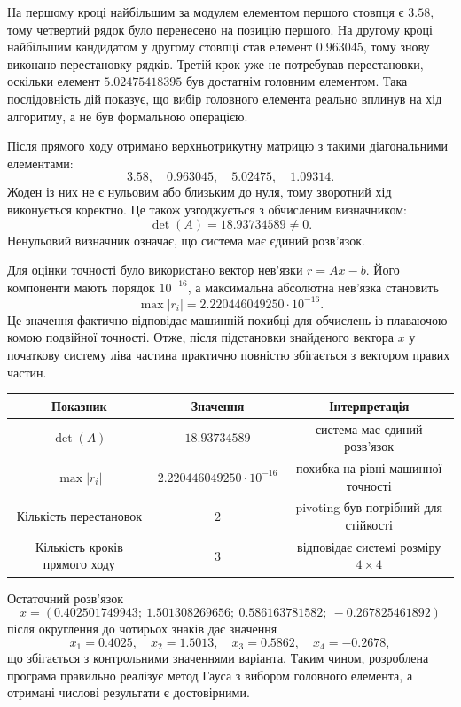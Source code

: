 \documentclass[12pt,a4paper]{article}
\begin{document}
    На першому кроці найбільшим за модулем елементом першого стовпця є $3.58$, тому четвертий
    рядок було перенесено на позицію першого. На другому кроці найбільшим кандидатом у другому
    стовпці став елемент $0.963045$, тому знову виконано перестановку рядків. Третій крок уже
    не потребував перестановки, оскільки елемент $5.02475418395$ був достатнім головним
    елементом. Така послідовність дій показує, що вибір головного елемента реально вплинув на
    хід алгоритму, а не був формальною операцією.

    Після прямого ходу отримано верхньотрикутну матрицю з такими діагональними елементами:
    \[
        3.58,\quad 0.963045,\quad 5.02475,\quad 1.09314.
    \]
    Жоден із них не є нульовим або близьким до нуля, тому зворотний хід виконується коректно.
    Це також узгоджується з обчисленим визначником:
    \[
        \det(A)=18.93734589 \neq 0.
    \]
    Ненульовий визначник означає, що система має єдиний розв'язок.

    Для оцінки точності було використано вектор нев'язки $r=Ax-b$. Його компоненти мають порядок
    $10^{-16}$, а максимальна абсолютна нев'язка становить
    \[
        \max |r_i|=2.220446049250\cdot10^{-16}.
    \]
    Це значення фактично відповідає машинній похибці для обчислень із плаваючою комою подвійної
    точності. Отже, після підстановки знайденого вектора $x$ у початкову систему ліва частина
    практично повністю збігається з вектором правих частин.

    \begin{center}
        \begin{tabular}{|c|c|c|}
            \hline
            Показник & Значення & Інтерпретація \\
            \hline
            $\det(A)$ & $18.93734589$ & система має єдиний розв'язок \\
            \hline
            $\max |r_i|$ & $2.220446049250\cdot10^{-16}$ & похибка на рівні машинної точності \\
            \hline
            Кількість перестановок & $2$ & pivoting був потрібний для стійкості \\
            \hline
            Кількість кроків прямого ходу & $3$ & відповідає системі розміру $4\times4$ \\
            \hline
        \end{tabular}
    \end{center}

    Остаточний розв'язок
    \[
        x=(0.402501749943;\ 1.501308269656;\ 0.586163781582;\ -0.267825461892)
    \]
    після округлення до чотирьох знаків дає значення
    \[
        x_1=0.4025,\quad x_2=1.5013,\quad x_3=0.5862,\quad x_4=-0.2678,
    \]
    що збігається з контрольними значеннями варіанта. Таким чином, розроблена програма правильно
    реалізує метод Гауса з вибором головного елемента, а отримані числові результати є
    достовірними.
\end{document}
